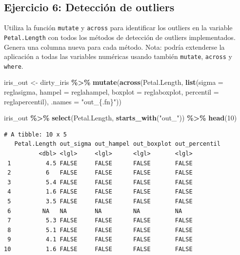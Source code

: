 \documentclass[
]{article}
\newenvironment{Shaded}{\begin{snugshade}}{\end{snugshade}}
\newcommand{\AttributeTok}[1]{\textcolor[rgb]{0.13,0.29,0.53}{#1}}
\newcommand{\DecValTok}[1]{\textcolor[rgb]{0.00,0.00,0.81}{#1}}
\newcommand{\FunctionTok}[1]{\textcolor[rgb]{0.13,0.29,0.53}{\textbf{#1}}}
\newcommand{\NormalTok}[1]{#1}
\newcommand{\OtherTok}[1]{\textcolor[rgb]{0.56,0.35,0.01}{#1}}
\newcommand{\SpecialCharTok}[1]{\textcolor[rgb]{0.81,0.36,0.00}{\textbf{#1}}}
\newcommand{\StringTok}[1]{\textcolor[rgb]{0.31,0.60,0.02}{#1}}
\begin{document}
\subsection{Ejercicio 6: Detección de
outliers}\label{ejercicio-6-detecciuxf3n-de-outliers}

Utiliza la función \texttt{mutate} y \texttt{across} para identificar
los outliers en la variable \texttt{Petal.Length} con todos los métodos
de detección de outliers implementados. Genera una columna nueva para
cada método. Nota: podría extenderse la aplicación a todas las variables
numéricas usando también \texttt{mutate}, \texttt{across} y
\texttt{where}.

\begin{Shaded}
\begin{Highlighting}[]
\NormalTok{iris\_out }\OtherTok{\textless{}{-}}\NormalTok{ dirty\_iris }\SpecialCharTok{\%\textgreater{}\%}
  \FunctionTok{mutate}\NormalTok{(}\FunctionTok{across}\NormalTok{(Petal.Length,}
                \FunctionTok{list}\NormalTok{(}\AttributeTok{sigma     =}\NormalTok{ reglasigma,}
                     \AttributeTok{hampel    =}\NormalTok{ reglahampel,}
                     \AttributeTok{boxplot   =}\NormalTok{ reglaboxplot,}
                     \AttributeTok{percentil =}\NormalTok{ reglapercentil),}
                \AttributeTok{.names =} \StringTok{"out\_\{.fn\}"}\NormalTok{))}

\NormalTok{iris\_out }\SpecialCharTok{\%\textgreater{}\%} \FunctionTok{select}\NormalTok{(Petal.Length, }\FunctionTok{starts\_with}\NormalTok{(}\StringTok{"out\_"}\NormalTok{)) }\SpecialCharTok{\%\textgreater{}\%} \FunctionTok{head}\NormalTok{(}\DecValTok{10}\NormalTok{)}
\end{Highlighting}
\end{Shaded}

\begin{verbatim}
# A tibble: 10 x 5
   Petal.Length out_sigma out_hampel out_boxplot out_percentil
          <dbl> <lgl>     <lgl>      <lgl>       <lgl>        
 1          4.5 FALSE     FALSE      FALSE       FALSE        
 2          6   FALSE     FALSE      FALSE       FALSE        
 3          5.4 FALSE     FALSE      FALSE       FALSE        
 4          1.6 FALSE     FALSE      FALSE       FALSE        
 5          3.5 FALSE     FALSE      FALSE       FALSE        
 6         NA   NA        NA         NA          NA           
 7          5.3 FALSE     FALSE      FALSE       FALSE        
 8          5.1 FALSE     FALSE      FALSE       FALSE        
 9          4.1 FALSE     FALSE      FALSE       FALSE        
10          1.6 FALSE     FALSE      FALSE       FALSE        
\end{verbatim}
\end{document}
